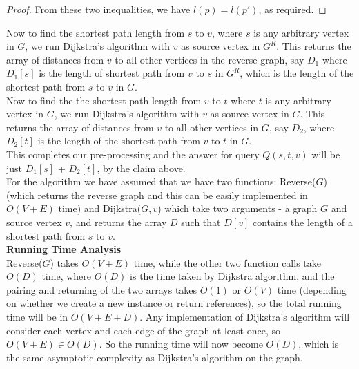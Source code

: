 \documentclass[answers]{exam}
\newcommand{\nl}{\vspace{0.2cm}\\}
\begin{document}
\begin{questions}
\begin{solution}
\begin{proof}
From these two inequalities, we have $l(p) = l(p')$, as required.
\end{proof}

Now to find the shortest path length from $s$ to $v$, where $s$ is any arbitrary vertex in $G$, we run Dijkstra's algorithm with $v$ as source vertex in $G^{R}$. This returns the array of distances from $v$ to all other vertices in the reverse graph, say $D_{1}$ where $D_{1}[s]$ is the length of shortest path from $v$ to $s$ in $G^R$, which is the length of the shortest path from $s$ to $v$ in $G$.\nl
Now to find the the shortest path length from $v$ to $t$ where $t$ is any arbitrary vertex in $G$, we run Dijkstra's algorithm with $v$ as source vertex in $G$. This returns the array of distances from $v$ to all other vertices in $G$, say $D_{2}$, where $D_2[t]$ is the length of the shortest path from $v$ to $t$ in $G$.\nl
This completes our pre-processing and the answer for query $Q(s,t,v)$ will be just $D_{1}[s]$ + $D_{2}[t]$, by the claim above.\nl
For the algorithm we have assumed that we have two functions: Reverse($G$) (which returns the reverse graph and this can be easily implemented in $O(V+E)$ time) and Dijkstra($G,v$) which take two arguments - a graph $G$ and source vertex $v$, and returns the array $D$ such that $D[v]$ contains the length of a shortest path from $s$ to $v$.\nl

\textbf{Running Time Analysis}\nl
Reverse($G$) takes $O(V+E)$ time, while the other two function calls take $O(D)$ time, where $O(D)$ is the time taken by Dijkstra algorithm, and the pairing and returning of the two arrays takes $O(1)$ or $O(V)$ time (depending on whether we create a new instance or return references), so the total running time will be in $O(V+E+D)$. Any implementation of Dijkstra's algorithm will consider each vertex and each edge of the graph at least once, so $O(V+E) \in O(D)$. So the running time will now become $O(D)$, which is the same asymptotic complexity as Dijkstra's algorithm on the graph.


\end{solution}
\end{questions}
\end{document}
